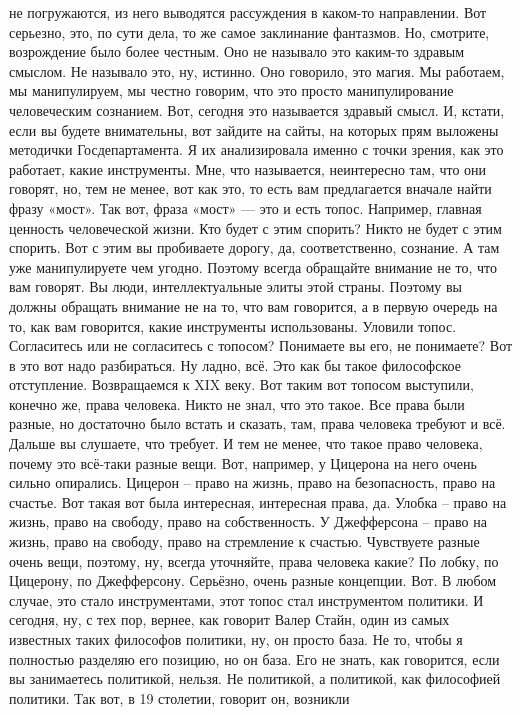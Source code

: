 не погружаются, из него выводятся рассуждения в каком-то направлении. Вот
серьезно, это, по сути дела, то же самое заклинание фантазмов. Но, смотрите,
возрождение было более честным. Оно не называло это каким-то здравым смыслом. Не
называло это, ну, истинно. Оно говорило, это магия. Мы работаем, мы
манипулируем, мы честно говорим, что это просто манипулирование человеческим
сознанием. Вот, сегодня это называется здравый смысл. И, кстати, если вы будете
внимательны, вот зайдите на сайты, на которых прям выложены методички
Госдепартамента. Я их анализировала именно с точки зрения, как это работает,
какие инструменты. Мне, что называется, неинтересно там, что они говорят, но,
тем не менее, вот как это, то есть вам предлагается вначале найти фразу «мост».
Так вот, фраза «мост» — это и есть топос. Например, главная ценность
человеческой жизни. Кто будет с этим спорить? Никто не будет с этим спорить. Вот
с этим вы пробиваете дорогу, да, соответственно, сознание. А там уже
манипулируете чем угодно. Поэтому всегда обращайте внимание не то, что вам
говорят. Вы люди, интеллектуальные элиты этой страны. Поэтому вы должны обращать
внимание не на то, что вам говорится, а в первую очередь на то, как вам
говорится, какие инструменты использованы. Уловили топос. Согласитесь или не
согласитесь с топосом? Понимаете вы его, не понимаете? Вот в это вот надо
разбираться. Ну ладно, всё. Это как бы такое философское отступление.
Возвращаемся к XIX веку. Вот таким вот топосом выступили, конечно же, права
человека. Никто не знал, что это такое. Все права были разные, но достаточно
было встать и сказать, там, права человека требуют и всё. Дальше вы слушаете,
что требует. И тем не менее, что такое право человека, почему это всё-таки
разные вещи. Вот, например, у Цицерона на него очень сильно опирались. Цицерон –
право на жизнь, право на безопасность, право на счастье. Вот такая вот была
интересная, интересная права, да. Улобка – право на жизнь, право на свободу,
право на собственность. У Джефферсона – право на жизнь, право на свободу, право
на стремление к счастью. Чувствуете разные очень вещи, поэтому, ну, всегда
уточняйте, права человека какие? По лобку, по Цицерону, по Джефферсону.
Серьёзно, очень разные концепции. Вот. В любом случае, это стало инструментами,
этот топос стал инструментом политики. И сегодня, ну, с тех пор, вернее, как
говорит Валер Стайн, один из самых известных таких философов политики, ну, он
просто база. Не то, чтобы я полностью разделяю его позицию, но он база. Его не
знать, как говорится, если вы занимаетесь политикой, нельзя. Не политикой, а
политикой, как философией политики. Так вот, в 19 столетии, говорит он, возникли
